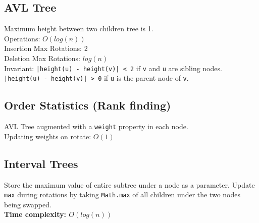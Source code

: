 \documentclass[10pt,landscape,a4paper]{article}
\begin{document}
\begin{multicols*}{4}
\subsection{AVL Tree}
Maximum height between two children tree is 1. \\
Operations: $O(log(n))$ \\
Insertion Max Rotations: 2 \\
Deletion Max Rotations: $log(n)$ \\
Invariant: \texttt{|height(u) - height(v)| < 2} if \texttt{v} and \texttt{u} are sibling nodes. \texttt{|height(u) - height(v)| > 0} if \texttt{u} is the parent node of \texttt{v}.
\subsection{Order Statistics (Rank finding)}
AVL Tree augmented with a \texttt{weight} property in each node. \\
Updating weights on rotate: $O(1)$ 


\subsection{Interval Trees}
Store the maximum value of entire subtree under a node as a parameter. Update \texttt{max} during rotations by taking \texttt{Math.max} of all children under the two nodes being swapped. \\
\textbf{Time complexity: $O(log(n))$} \\


\end{multicols*}
\end{document}
